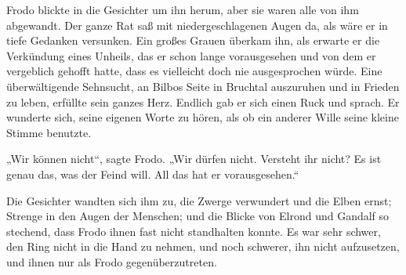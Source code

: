 Frodo blickte in die Gesichter um ihn herum, aber sie waren alle von ihm abgewandt. Der ganze Rat saß mit niedergeschlagenen Augen da, als wäre er in tiefe Gedanken versunken. Ein großes Grauen überkam ihn, als erwarte er die Verkündung eines Unheils, das er schon lange vorausgesehen und von dem er vergeblich gehofft hatte, dass es vielleicht doch nie ausgesprochen würde. Eine überwältigende Sehnsucht, an Bilbos Seite in Bruchtal auszuruhen und in Frieden zu leben, erfüllte sein ganzes Herz. Endlich gab er sich einen Ruck und sprach. Er wunderte sich, seine eigenen Worte zu hören, als ob ein anderer Wille seine kleine Stimme benutzte.

„Wir können nicht“, sagte Frodo. „Wir dürfen nicht. Versteht ihr nicht? Es ist genau das, was der Feind will. All das hat er vorausgesehen.“

Die Gesichter wandten sich ihm zu, die Zwerge verwundert und die Elben ernst; Strenge in den Augen der Menschen; und die Blicke von Elrond und Gandalf so stechend, dass Frodo ihnen fast nicht standhalten konnte. Es war sehr schwer, den Ring nicht in die Hand zu nehmen, und noch schwerer, ihn nicht aufzusetzen, und ihnen nur als Frodo gegenüberzutreten.

